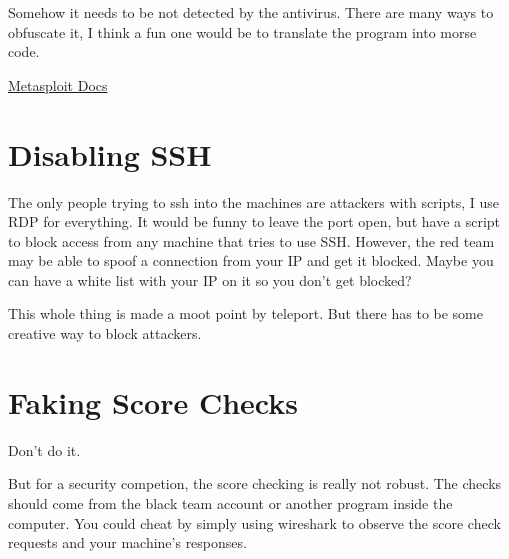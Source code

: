 \documentclass{article}
\begin{document}
Somehow it needs to be not detected by the antivirus. There are many ways to obfuscate it, I think a fun one would be
to translate the program into morse code.

\href{https://docs.metasploit.com/docs/using-metasploit/basics/how-to-use-a-reverse-shell-in-metasploit.html\#windows-common-reverse-shell}{Metasploit Docs}

\section{Disabling SSH}
The only people trying to ssh into the machines are attackers with scripts, I use RDP for everything.
It would be funny to leave the port open, but have a script to block access from any machine that tries to use SSH.
However, the red team may be able to spoof a connection from your IP and get it blocked.
Maybe you can have a white list with your IP on it so you don't get blocked?

This whole thing is made a moot point by teleport. But there has to be some creative way to block attackers.

\section{Faking Score Checks}
Don't do it.

\vspace{1cm}
But for a security competion, the score checking is really not robust. 
The checks should come from the black team account or another program inside the computer.
You could cheat by simply using wireshark to observe the score check requests and your machine's responses.
\end{document}
